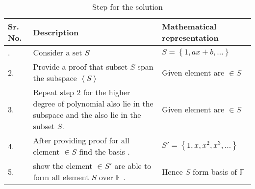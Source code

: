 \documentclass[journal,12pt,twocolumn]{IEEEtran}
\begin{document}
\renewcommand{\thetable}{1}
\begin{table}[htb!]
	\caption{Step for the solution }
\label{t1} 
	\tiny
	{
	\begin{tabular}{|l|p{4cm}|p{3cm}|}
		\hline
		\centering
		\textbf{Sr. No.} & \textbf{Description} & \textbf{ Mathematical  representation} \\ 
				\hline
					\centering 
			1. & Consider  a set $S$ & $S = \left \{    1, ax+b, \dots  \right \}$   \\
				\hline
					2. & Provide a proof that subset $S$ span the subspace $\left \langle S \right \rangle$  & Given element are $\in S $  \\
				\hline
					3. & Repeat  step 2 for the higher degree of polynomial also lie in the subspace and the also lie in the subset $S$. & Given element are $\in S $  \\
				\hline	
					4. &After providing proof for all element $\in S$ find the basis  . & $ S'=\left \{    1, x, x^2, x^3,  \dots  \right \} $  \\
				\hline
					5. & show the element $\in S'$ are  able to form all element $S$ over $\mathbb{F}$ . & Hence $S$ form basis of $\mathbb{F}$    \\
				\hline
\end{tabular} 

}
\end{table}
\end{document}
